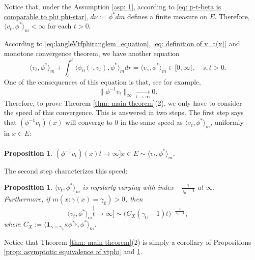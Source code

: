 \documentclass[12pt, a4paper]{amsart}
\newtheorem{prop}[thm]{Proposition}
\theoremstyle{definition}
\numberwithin{equation}{section}
\begin{document}
	Notice that,
	under the Assumption \ref{asp: 1}, according to \eqref{eq: p-t-beta is comparable to phi phi-star}, $d\nu:= \phi^* dm$ defines a finite measure on $E$.
	Therefore, $\langle v_t, \phi^*\rangle_m < \infty$ for each $t>0$.

	According to \eqref{eq:langleVtfphiranglem_equation}, \eqref{eq: definition of v_t(x)} and monotone convergence theorem,
	we have another equation
\[ \label{eq: equation of <vt,phi>}
	 \langle v_t,\phi^*\rangle_m + \int_s^t \langle \psi_0(\cdot ,v_t) , \phi^*\rangle_m dr
	= \langle v_s,\phi^*\rangle_m
	\in [0,\infty),
	\quad s, t > 0.
\]
	One of the consequences of this equation is that, see \cite[Lemma 5.1]{RenSongSun2017Spine} for example, %
\[\label{eq: uniform converges to 0}
    \|\phi^{-1}v_t\|_{\infty} \xrightarrow[t\to \infty]{} 0.
\]
	Therefore, to prove Theorem \ref{thm: main theorem}(2), we only have to consider the speed of this convergence.
	This is answered in two steps. 
	The first step says that $(\phi^{-1}v_t)(x)$ will converge to $0$ in the same speed as $\langle v_t,\phi^*\rangle_m $, uniformly in $x\in E$:

\begin{prop}
\label{prop: convergence in a same speed}
	$(\phi^{-1}v_t)(x) \stackrel[t\to\infty]{x\in E}{\sim} \langle v_t,\phi^*\rangle_m$.
\end{prop}
\label{prop: asymptotic equivalence of vtphi}
	The second step characterizes this speed:
\begin{prop}
\label{prop: regularly varying of vt-phi-star}
	$\langle v_t,\phi^*\rangle_m $ is regularly varying with index $-\frac{1}{\gamma_0-1}$ at $\infty$.
	Furthermore, if $m(x: \gamma (x)= \gamma_0)>0$, then
\[
	\langle v_t,\phi^*\rangle_m
	\stackrel[t\to \infty]{}{\sim} \big(C_X(\gamma_0-1) t \big)^{-\frac{1}{\gamma_0 - 1}},
\]
	where $C_X:= \langle \mathbf 1_{\gamma= \gamma_0} \kappa \phi^{\gamma_0}, \phi^* \rangle_m $.
\end{prop}

	Notice that
	Theorem \ref{thm: main theorem}(2) is simply a corollary of Propositions \ref{prop: asymptotic equivalence of vtphi} and \ref{prop: regularly varying of vt-phi-star}.
\end{document}
